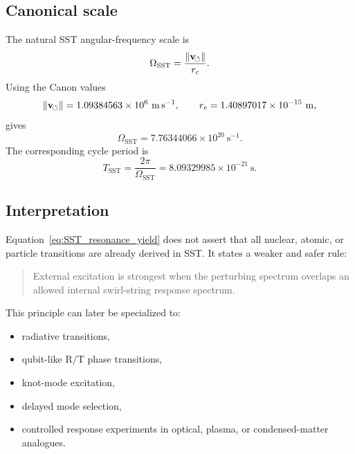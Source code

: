     \subsection*{Canonical scale}
        
        The natural SST angular-frequency scale is
        \begin{equation}
            \Omega_{\mathrm{SST}}
            =
            \frac{\lVert\mathbf{v}_{\!\boldsymbol{\circlearrowleft}}\rVert}{r_c}.
            \label{eq:Omega_SST_scale}
        \end{equation}
        Using the Canon values
        \[
            \vnorm = 1.09384563\times10^{6}\ \mathrm{m\,s^{-1}},
            \qquad
            \rc = 1.40897017\times10^{-15}\ \mathrm{m},
        \]
        gives
        \begin{equation}
            \Omega_{\mathrm{SST}}
            =
            7.76344066\times10^{20}\ \mathrm{s^{-1}}.
            \label{eq:Omega_SST_numeric}
        \end{equation}
        The corresponding cycle period is
        \begin{equation}
            T_{\mathrm{SST}}
            =
            \frac{2\pi}{\Omega_{\mathrm{SST}}}
            =
            8.09329985\times10^{-21}\ \mathrm{s}.
            \label{eq:T_SST_numeric}
        \end{equation}
    
    \subsection*{Interpretation}
        
        Equation~\eqref{eq:SST_resonance_yield} does not assert that all nuclear, atomic, or particle transitions are already derived in SST. It states a weaker and safer rule:
        
        \begin{quote}
            External excitation is strongest when the perturbing spectrum overlaps an allowed internal swirl-string response spectrum.
        \end{quote}
        
        This principle can later be specialized to:
        \begin{itemize}
            \item radiative transitions,
            \item qubit-like R/T phase transitions,
            \item knot-mode excitation,
            \item delayed mode selection,
            \item controlled response experiments in optical, plasma, or condensed-matter analogues.
        \end{itemize}
    
